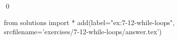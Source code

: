 
\begin{ex}
  \label{ex:7-12-while-loops}
  
  \qed
\end{ex}
\begin{python0}
from solutions import *
add(label="ex:7-12-while-loops",
    srcfilename='exercises/7-12-while-loops/answer.tex')
\end{python0}
